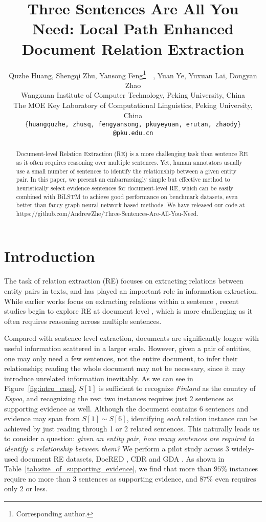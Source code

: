 \documentclass[11pt,a4paper]{article}
\title{Three Sentences Are All You Need: Local Path Enhanced Document Relation Extraction}
\author{
    Quzhe Huang, 
    Shengqi Zhu, 
    Yansong Feng\thanks{\;\;Corresponding author.}~~,  
    Yuan Ye,
    Yuxuan Lai,
    Dongyan Zhao \\
    Wangxuan Institute of Computer Technology, Peking University, China\\
    The MOE Key Laboratory of Computational Linguistics, Peking University, China\\
    {\tt \{huangquzhe, zhusq, fengyansong, pkuyeyuan, erutan, zhaody\}} 
    \\ {\tt @pku.edu.cn} \\
}
\date{}
\begin{document}
\maketitle
\begin{abstract}
Document-level Relation Extraction (RE) is a more challenging task than sentence RE as it often requires reasoning over multiple sentences. Yet, human annotators usually use a small number of sentences to identify the relationship between a given entity pair. In this paper, we present an embarrassingly simple but effective method to heuristically select evidence sentences for document-level RE, which can be easily combined with BiLSTM to achieve 
good performance on benchmark datasets, even better than fancy graph neural network based methods.  We have released our code at https://github.com/AndrewZhe/Three-Sentences-Are-All-You-Need.

\end{abstract}



\section{Introduction}
The task of relation extraction (RE) focuses on extracting relations between entity pairs in texts, and has played an important role in information extraction. While earlier works focus on extracting relations within a sentence \cite{lin2016neural, zhang-etal-2018-graph},
recent studies begin to explore RE at document level \cite{peng2017cross,zeng-etal-2020-double, nan-etal-2020-reasoning},
which is more challenging as it often requires reasoning across multiple sentences.

Compared with sentence level extraction, documents are significantly longer with useful information scattered in a larger scale. However, given a pair of entities, one may only need a few sentences, not the entire document, to infer their relationship; reading the whole document may not be necessary, since it may introduce unrelated information inevitably.
As we can see in Figure~\ref{fig:intro_case}, $S[1]$ is sufficient to recognize \textit{Finland} as the country of \textit{Espoo}, and recognizing the rest two instances requires just 2 sentences as supporting evidence as well. Although the document contains 6 sentences and evidence may span from $S[1] \sim S[6]$, identifying \textit{each} relation instance can be achieved by just reading through 1 or 2 related sentences. This naturally leads us to consider a question: \textit{given an entity pair, how many sentences are required to identify a relationship between them?} We perform a pilot study across 
3 widely-used document RE datasets, DocRED \cite{yao_docred_2019}, CDR \cite{li2016biocreative} and GDA \cite{wu2019renet}. As shown in Table~\ref{tab:size_of_supporting_evidence}, we find that more than $95\%$ instances require no more than 3 sentences as supporting evidence, and $87\%$ even requires only 2 or less.
\end{document}
